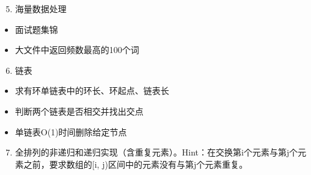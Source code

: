 \documentclass[letterpaper,10pt,english]{sphinxmanual}
\begin{document}
\begin{quote}

\end{quote}
\begin{enumerate}
\setcounter{enumi}{4}
\item {} 
海量数据处理

\end{enumerate}
\begin{itemize}
\item {} 
面试题集锦
\begin{quote}

\end{quote}

\item {} 
大文件中返回频数最高的100个词
\begin{quote}

\end{quote}

\end{itemize}
\begin{enumerate}
\setcounter{enumi}{5}
\item {} 
链表

\end{enumerate}
\begin{itemize}
\item {} 
求有环单链表中的环长、环起点、链表长
\begin{quote}

\end{quote}

\item {} 
判断两个链表是否相交并找出交点
\begin{quote}

\end{quote}

\item {} 
单链表O(1)时间删除给定节点
\begin{quote}

\end{quote}

\end{itemize}
\begin{enumerate}
\setcounter{enumi}{6}
\item {} 
全排列的非递归和递归实现（含重复元素）。Hint：在交换第i个元素与第j个元素之前，要求数组的{[}i, j)区间中的元素没有与第j个元素重复。

\end{enumerate}
\end{document}
